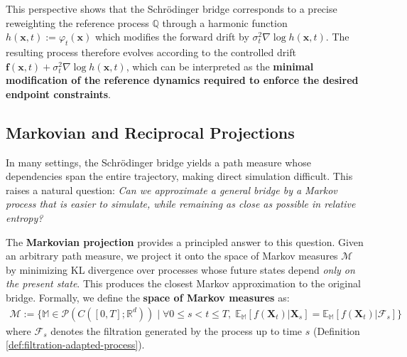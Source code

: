 \documentclass{article}
\newcommand{\boldtext}[1]{\textbf{\textcolor{MyGreen}{#1}}}
\begin{document}
This perspective shows that the Schrödinger bridge corresponds to a precise reweighting the reference process $\mathbb{Q}$ through a harmonic function $h(\boldsymbol{x},t):= \varphi_t(\boldsymbol{x})$ which modifies the forward drift by $\sigma_t^2\nabla\log h(\boldsymbol{x},t)$.  The resulting process therefore evolves according to the controlled drift $\boldsymbol{f}(\boldsymbol{x},t) + \sigma_t^2 \nabla \log h(\boldsymbol{x},t)$, which can be interpreted as the \textbf{minimal modification of the reference dynamics required to enforce the desired endpoint constraints}.

\subsection{Markovian and Reciprocal Projections}
\label{subsec:markov-reciprocal-proj}
In many settings, the Schrödinger bridge yields a path measure whose dependencies span the entire trajectory, making direct simulation difficult. This raises a natural question: \textit{Can we approximate a general bridge by a Markov process that is easier to simulate, while remaining as close as possible in relative entropy?}

The \boldtext{Markovian projection} provides a principled answer to this question. Given an arbitrary path measure, we project it onto the space of Markov measures $\mathcal{M}$ by minimizing KL divergence over processes whose future states depend \textit{only on the present state}. This produces the closest Markov approximation to the original bridge. Formally, we define the \boldtext{space of Markov measures} as:
\begin{align}
    \mathcal{M}:=\big\{\mathbb{M}\in \mathcal{P}(C([0,T]; \mathbb{R}^d))\;|\;\forall 0\leq s<t\leq T, \;\mathbb{E}_{\mathbb{M}}[f(\boldsymbol{X}_t)|\boldsymbol{X}_s]=\mathbb{E}_{\mathbb{M}}[f(\boldsymbol{X}_t)|\mathcal{F}_s]\big\}
\end{align}
where $\mathcal{F}_s$ denotes the filtration generated by the process up to time $s$ (Definition \ref{def:filtration-adapted-process}).
\end{document}
